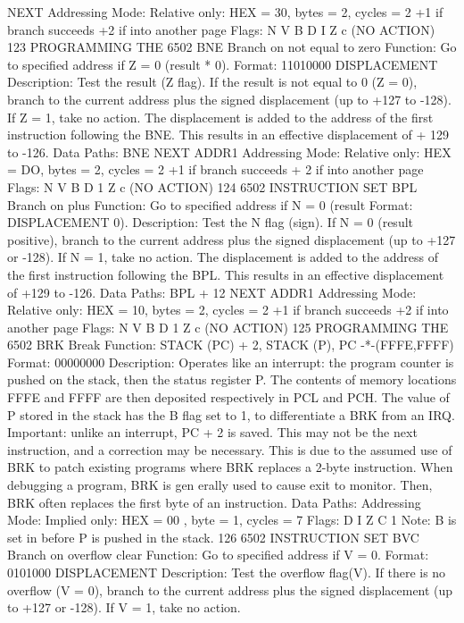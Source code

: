 NEXT
Addressing Mode:
Relative only:
HEX = 30, bytes = 2, cycles = 2 +1 if branch succeeds
+2 if into another page
Flags:
N V B D I Z c
(NO ACTION)
123
PROGRAMMING THE 6502
BNE Branch on not equal to zero
Function:
Go to specified address if Z = 0 (result * 0).
Format: 11010000 DISPLACEMENT
Description:
Test the result (Z flag). If the result is not equal to 0 (Z = 0),
branch to the current address plus the signed displacement (up to
+127 to -128). If Z = 1, take no action.
The displacement is added to the address of the first instruction
following the BNE. This results in an effective displacement of
+ 129 to -126.
Data Paths:
BNE
NEXT ADDR1
Addressing Mode:
Relative only:
HEX = DO, bytes = 2, cycles = 2 +1 if branch succeeds
+ 2 if into another page
Flags:
N V B D 1 Z c
(NO ACTION)
124
6502 INSTRUCTION SET
BPL Branch on plus
Function:
Go to specified address if N = 0 (result
Format: DISPLACEMENT
0).
Description:
Test the N flag (sign). If N = 0 (result positive), branch to the
current address plus the signed displacement (up to +127 or
-128). If N = 1, take no action.
The displacement is added to the address of the first instruction
following the BPL. This results in an effective displacement of
+129 to -126.
Data Paths:
BPL
+ 12
NEXT ADDR1
Addressing Mode:
Relative only:
HEX = 10, bytes = 2, cycles = 2 +1 if branch succeeds
+2 if into another page
Flags:
N V B D 1 Z c
(NO ACTION)
125
PROGRAMMING THE 6502
BRK Break
Function:
STACK (PC) + 2, STACK (P), PC -*-(FFFE,FFFF)
Format: 00000000
Description:
Operates like an interrupt: the program counter is pushed on
the stack, then the status register P. The contents of memory
locations FFFE and FFFF are then deposited respectively in PCL
and PCH. The value of P stored in the stack has the B flag set to 1,
to differentiate a BRK from an IRQ.
Important: unlike an interrupt, PC + 2 is saved. This may not
be the next instruction, and a correction may be necessary. This is
due to the assumed use of BRK to patch existing programs where BRK
replaces a 2-byte instruction. When debugging a program, BRK is gen
erally used to cause exit to monitor. Then, BRK often replaces the first
byte of an instruction.
Data Paths:
Addressing Mode:
Implied only:
HEX = 00 , byte = 1, cycles = 7
Flags:
D I Z C
1
Note: B is set in before P is pushed in the stack.
126
6502 INSTRUCTION SET
BVC Branch on overflow clear
Function:
Go to specified address if V = 0.
Format: 0101000 DISPLACEMENT
Description:
Test the overflow flag(V). If there is no overflow (V = 0), branch
to the current address plus the signed displacement (up to +127
or -128). If V = 1, take no action.
